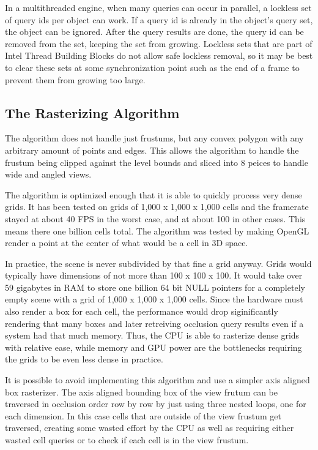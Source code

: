 \documentclass[12pt]{ucthesis}
\begin{document}
In a multithreaded engine, when many queries can occur in parallel, a lockless set of query ids per object can work.
If a query id is already in the object's query set, the object can be ignored.
After the query results are done, the query id can be removed from the set, keeping the set from growing.
Lockless sets that are part of Intel Thread Building Blocks do not allow safe lockless removal, so it may be best to clear these sets at some synchronization point such as the end of a frame to prevent them from growing too large.\cite{tbb}

\subsection{The Rasterizing Algorithm}
\label{the-rasterizing-algorithm}
The algorithm does not handle just frustums, but any convex polygon with any arbitrary amount of points and edges.
This allows the algorithm to handle the frustum being clipped against the level bounds and sliced into 8 peices to handle wide and angled views.

The algorithm is optimized enough that it is able to quickly process very dense grids.
It has been tested on grids of 1,000 x 1,000 x 1,000 cells and the framerate stayed at about 40 FPS in the worst case, and at about 100 in other cases.
This means there one billion cells total.
The algorithm was tested by making OpenGL render a point at the center of what would be a cell in 3D space.

In practice, the scene is never subdivided by that fine a grid anyway.
Grids would typically have dimensions of not more than 100 x 100 x 100.
It would take over 59 gigabytes in RAM to store one billion 64 bit NULL pointers for a completely empty scene with a grid of 1,000 x 1,000 x 1,000 cells.
Since the hardware must also render a box for each cell, the performance would drop siginificantly rendering that many boxes and later retreiving occlusion query results even if a system had that much memory.
Thus, the CPU is able to rasterize dense grids with relative ease, while memory and GPU power are the bottlenecks requiring the grids to be even less dense in practice.

It is possible to avoid implementing this algorithm and use a simpler axis aligned box rasterizer.
The axis aligned bounding box of the view frutum can be traversed in occlusion order row by row by just using three nested loops, one for each dimension.
In this case cells that are outside of the view frustum get traversed, creating some wasted effort by the CPU as well as requiring either wasted cell queries or to check if each cell is in the view frustum.
\end{document}
